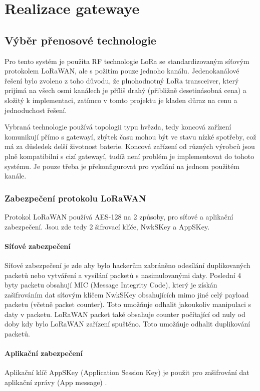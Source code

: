\chapter{Realizace gatewaye}

\section{Výběr přenosové technologie}
Pro tento systém je použita RF technologie LoRa se standardizovaným síťovým protokolem LoRaWAN, ale s požitím pouze jednoho kanálu.
Jedenokanálové řešení bylo zvoleno z toho důvodu, že plnohodnotný LoRa transceiver, který prijímá na všech osmi kanálech je příliš drahý (přibližně desetinásobná cena) a složitý k implementaci, zatímco v tomto projektu je kladen důraz na cenu a jednoduchost řešení.

Vybraná technologie používá topologii typu hvězda, tedy koncová zařízení komunikují přímo s gatewayí, zbýtek času mohou být ve stavu nízké spotřeby, což má za důsledek delší životnost baterie.
Koncová zařízení od různých výrobců jsou plně kompatibilní s cizí gatewayí, tudíž není problém je implementovat do tohoto systému. Je pouze třeba je překonfigurovat pro vysílání na jednom použitém kanále.

\subsection{Zabezpečení protokolu LoRaWAN}
Protokol LoRaWAN používá AES-128 na 2 způsoby, pro síťové a aplikační zabezpečení. Jsou zde tedy 2 šifrovací klíče, NwkSKey a AppSKey.

\subsubsection{Síťové zabezpečení}
Síťové zabezpečení je zde aby bylo hackerům zabráněno odesílání duplikovaných packetů nebo vytváření a vysílání packetů s nasimulovanými daty.
Poslední 4 byty packetu obsahují MIC (Message Integrity Code), který je získán zašifrováním dat síťovým klíčem NwkSKey obsahujících mimo jiné celý payload packetu (včetně packet counter). Toto umožňuje odhalit jakoukoliv manipulaci s daty v packetu. LoRaWAN packet také obsahuje counter počítající od nuly od doby kdy bylo LoRaWAN zařízení spuštěno. Toto umožňuje odhalit duplikování packetů.


\subsubsection{Aplikační zabezpečení}
Aplikační klíč AppSKey (Application Session Key) je použit pro zašifrování dat aplikační zprávy (App message) \cite{lwSpec} \cite{lwSecur}.


